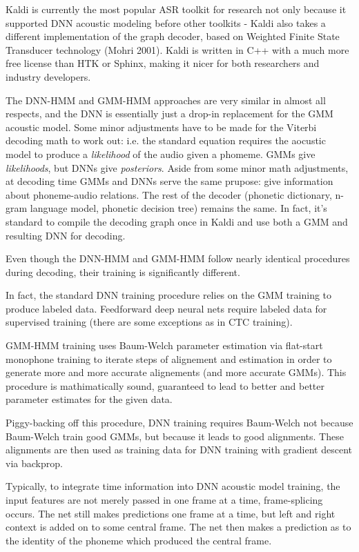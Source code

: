 \documentclass[10pt,a4paper]{article}
\begin{document}
Kaldi is currently the most popular ASR toolkit for research not only because it supported DNN acoustic modeling before other toolkits - Kaldi also takes a different implementation of the graph decoder, based on Weighted Finite State Transducer technology (Mohri 2001). Kaldi is written in C++ with a much more free license than HTK or Sphinx, making it nicer for both researchers and industry developers.

The DNN-HMM and GMM-HMM approaches are very similar in almost all respects, and the DNN is essentially just a drop-in replacement for the GMM acoustic model. Some minor adjustments have to be made for the Viterbi decoding math to work out: i.e. the standard equation requires the aocustic model to produce a \textit{likelihood} of the audio given a phomeme. GMMs give \textit{likelihoods}, but DNNs give \textit{posteriors}. Aside from some minor math adjustments, at decoding time GMMs and DNNs serve the same prupose: give information about phoneme-audio relations. The rest of the decoder (phonetic dictionary, n-gram language model, phonetic decision tree) remains the same. In fact, it's standard to compile the decoding graph once in Kaldi and use both a GMM and resulting DNN for decoding.

Even though the DNN-HMM and GMM-HMM follow nearly identical procedures during decoding, their training is significantly different.

In fact, the standard DNN training procedure relies on the GMM training to produce labeled data. Feedforward deep neural nets require labeled data for supervised training (there are some exceptions as in CTC training).

GMM-HMM training uses Baum-Welch parameter estimation via flat-start monophone training to iterate steps of alignement and estimation in order to generate more and more accurate alignements (and more accurate GMMs). This procedure is mathimatically sound, guaranteed to lead to better and better parameter estimates for the given data.

Piggy-backing off this procedure, DNN training requires Baum-Welch not because Baum-Welch train good GMMs, but because it leads to good alignments. These alignments are then used as training data for DNN training with gradient descent via backprop.

Typically, to integrate time information into DNN acoustic model training, the input features are not merely passed in one frame at a time, frame-splicing occurs. The net still makes predictions one frame at a time, but left and right context is added on to some central frame. The net then makes a prediction as to the identity of the phoneme which produced the central frame.
\end{document}
